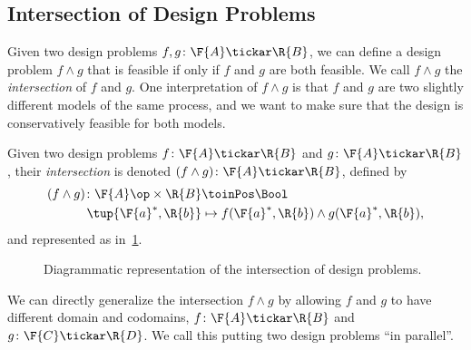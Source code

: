 \subsection{Intersection of Design Problems}
Given two design problems $f, g \colon \F{A} \tickar \R{B}$, we can define a design problem $f \wedge g$ that is feasible if only if $f$ and $g$ are both feasible. We call $f \wedge g$ the \emph{intersection} of $f$ and $g$. One interpretation of $f \wedge g$ is that $f$ and $g$ are two slightly different models of the same process, and we want to make sure that the design is conservatively feasible for both models.

\begin{definition}
Given two design problems $f\colon \F{A} \tickar \R{B}$ and $g\colon \F{A} \tickar \R{B}$,
their \emph{intersection} is denoted $(f \wedge g)\colon \F{A} \tickar \R{B}$, defined by
\begin{equation}
	\begin{aligned}
		(f \wedge g)\colon \F{A}\op \times \R{B} & \toinPos \Bool \\
		\tup{\F{a}^*, \R{b}} & \mapsto f(\F{a}^*, \R{b}) \wedge  g(\F{a}^*, \R{b}),
	\end{aligned}
\end{equation}
and represented as in~\cref{fig:intersectiondp}.

\begin{figure}[h!]
\begin{center}
\end{center}
\caption{Diagrammatic representation of the intersection of design problems. \label{fig:intersectiondp}}
\end{figure}
\end{definition}

We can directly generalize the intersection $f \wedge g$ by allowing $f$ and $g$ to have different domain and codomains, $f \colon \F{A} \tickar \R{B}$ and $g \colon \F{C} \tickar \R{D}$. We call this putting two design problems ``in parallel''.

